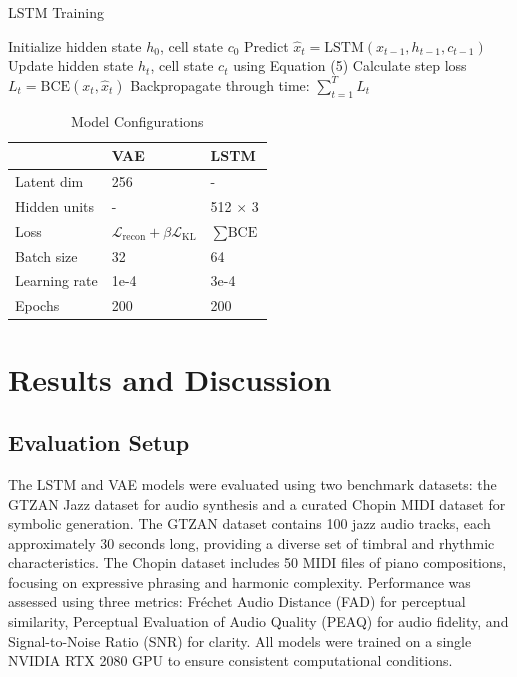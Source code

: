 \documentclass[conference]{IEEEtran}
\begin{document}
\begin{algorithm}[H]
\caption{LSTM Training}
\begin{algorithmic}[1]
\STATE Initialize hidden state $h_0$, cell state $c_0$
        \STATE Predict $\hat{x}_t = \text{LSTM}(x_{t-1}, h_{t-1}, c_{t-1})$
        \STATE Update hidden state $h_t$, cell state $c_t$ using Equation (5)
        \STATE Calculate step loss $L_t = \text{BCE}(x_t, \hat{x}_t)$
    \ENDFOR
    \STATE Backpropagate through time: $\sum_{t=1}^{T} L_t$
\ENDFOR
\end{algorithmic}
\end{algorithm}

\begin{table}[h]
\caption{Model Configurations}
\label{tab:config}
\centering
\begin{tabular}{l|ll}
& VAE & LSTM \\
\hline
Latent dim & 256 & - \\
Hidden units & - & 512 $\times$ 3 \\
Loss & $\mathcal{L}_{\text{recon}} + \beta \mathcal{L}_{\text{KL}}$ & $\sum \text{BCE}$ \\
Batch size & 32 & 64 \\
Learning rate & 1e-4 & 3e-4 \\
Epochs & 200 & 200 \\
\end{tabular}
\end{table}

\section{Results and Discussion}
\label{sec:results}

\subsection{Evaluation Setup}
The LSTM and VAE models were evaluated using two benchmark datasets: the GTZAN Jazz dataset for audio synthesis and a curated Chopin MIDI dataset for symbolic generation. The GTZAN dataset contains 100 jazz audio tracks, each approximately 30 seconds long, providing a diverse set of timbral and rhythmic characteristics. The Chopin dataset includes 50 MIDI files of piano compositions, focusing on expressive phrasing and harmonic complexity. Performance was assessed using three metrics: Fréchet Audio Distance (FAD) for perceptual similarity, Perceptual Evaluation of Audio Quality (PEAQ) for audio fidelity, and Signal-to-Noise Ratio (SNR) for clarity. All models were trained on a single NVIDIA RTX 2080 GPU to ensure consistent computational conditions.
\end{document}
